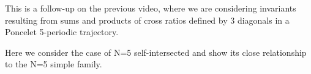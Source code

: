 This is a follow-up on the previous video, where we are considering invariants resulting from sums and products of cross ratios defined by 3 diagonals in a Poncelet 5-periodic trajectory.

Here we consider the case of N=5 self-intersected and show its close relationship to the N=5 simple family.